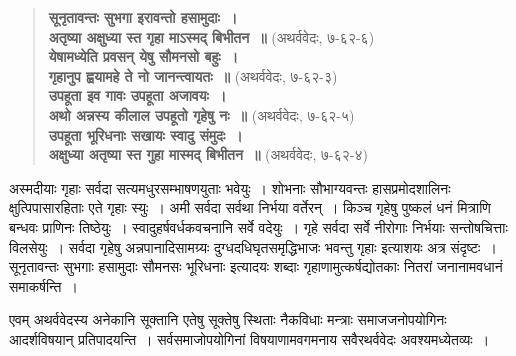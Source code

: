 \begin{verse}
\textbf{सूनृतावन्तः सुभगा इरावन्तो हसामुदाः~।}\\
\textbf{अतृष्या अक्षुध्या स्त गृहा माऽस्मद् बिभीतन~॥} (अथर्ववेदः, ७-६२-६)\\
\textbf{येषामध्येति प्रवसन् येषु सौमनसो बहुः~।}\\
\textbf{गृहानुप ह्वयामहे ते नो जानन्त्वायतः~॥} (अथर्ववेदः, ७-६२-३)\\
\textbf{उपहूता इव गावः उपहूता अजावयः~।}\\
\textbf{अथो अन्नस्य कीलाल उपहूतो गृहेषु नः~॥} (अथर्ववेदः, ७-६२-५)\\
\textbf{उपहूता भूरिधनाः सखायः स्वादु संमुदः~।}\\
\textbf{अक्षुध्या अतृष्या स्त गुहा मास्मद् बिभीतन~॥} (अथर्ववेदः, ७-६२-४)
\end{verse}

अस्मदीयाः गृहाः सर्वदा सत्यमधुरसम्भाषणयुताः भवेयुः~। शोभनाः सौभाग्यवन्तः हासप्रमोदशालिनः क्षुत्पिपासारहिताः एते गृहाः स्युः~। अमी सर्वदा सर्वथा निर्भया वर्तेरन्~। किञ्च गृहेषु पुष्कलं धनं मित्राणि बन्धवः प्राणिनः तिष्ठेयुः~। स्वादुहर्षवर्धकवचनानि सर्वे वदेयुः~। गृहे सर्वदा सर्वे नीरोगाः निर्भयाः सन्तोषचित्ताः विलसेयुः~। सर्वदा गृहेषु अन्नपानादिसामग्र्यः दुग्धदधिघृतसमृद्धिभाजः भवन्तु गृहाः इत्याशयः अत्र संदृष्टः~। सूनृतावन्तः सुभगाः हसामुदाः सौमनसः भूरिधनाः इत्यादयः शब्दाः गृहाणामुत्कर्षद्योतकाः नितरां जनानामवधानं समाकर्षन्ति~।

एवम् अथर्ववेदस्य अनेकानि सूक्तानि एतेषु सूक्तेषु स्थिताः नैकविधाः मन्त्राः समाजजनोपयोगिनः आदर्शविषयान् प्रतिपादयन्ति~। सर्वसमाजोपयोगिनां विषयाणामवगमनाय सवैरथर्ववेदः अवश्यमध्येतव्यः~।

